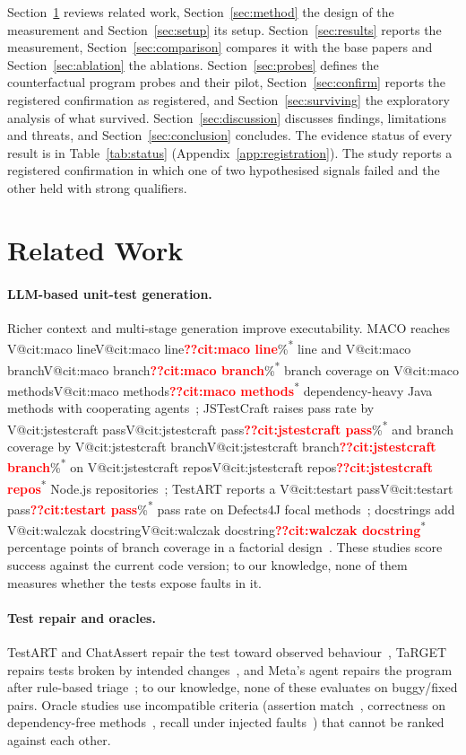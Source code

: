 \documentclass[pdflatex,iicol,sn-mathphys-num]{sn-jnl}
\makeatletter
\newcommand{\V}[1]{\ifcsname V@#1\endcsname\csname V@#1\endcsname\else\textbf{\textcolor{red}{??#1}}\fi}
\newcommand{\cited}{\textsuperscript{*}}
\makeatother
\begin{document}
Section~\ref{sec:related} reviews related work, Section~\ref{sec:method} the design of the measurement and Section~\ref{sec:setup} its setup. Section~\ref{sec:results} reports the measurement, Section~\ref{sec:comparison} compares it with the base papers and Section~\ref{sec:ablation} the ablations. Section~\ref{sec:probes} defines the counterfactual program probes and their pilot, Section~\ref{sec:confirm} reports the registered confirmation as registered, and Section~\ref{sec:surviving} the exploratory analysis of what survived. Section~\ref{sec:discussion} discusses findings, limitations and threats, and Section~\ref{sec:conclusion} concludes. The evidence status of every result is in Table~\ref{tab:status} (Appendix~\ref{app:registration}). The study reports a registered confirmation in which one of two hypothesised signals failed and the other held with strong qualifiers.

\section{Related Work}\label{sec:related}

\paragraph{LLM-based unit-test generation.} Richer context and multi-stage generation improve executability. MACO reaches \V{cit:maco line}\%\cited{} line and \V{cit:maco branch}\%\cited{} branch coverage on \V{cit:maco methods}\cited{} dependency-heavy Java methods with cooperating agents~\cite{xie2026maco}; JSTestCraft raises pass rate by \V{cit:jstestcraft pass}\%\cited{} and branch coverage by \V{cit:jstestcraft branch}\%\cited{} on \V{cit:jstestcraft repos}\cited{} Node.js repositories~\cite{liu2026jstestcraft}; TestART reports a \V{cit:testart pass}\%\cited{} pass rate on Defects4J focal methods~\cite{gu2026testart}; docstrings add \V{cit:walczak docstring}\cited{} percentage points of branch coverage in a factorial design~\cite{walczak2026context}. These studies score success against the current code version; to our knowledge, none of them measures whether the tests expose faults in it.

\paragraph{Test repair and oracles.} TestART and ChatAssert repair the test toward observed behaviour~\cite{gu2026testart,hayet2025chatassert}, TaRGET repairs tests broken by intended changes~\cite{yaraghi2025target}, and Meta's agent repairs the program after rule-based triage~\cite{maddila2026agentic}; to our knowledge, none of these evaluates on buggy/fixed pairs. Oracle studies use incompatible criteria (assertion match~\cite{hayet2025chatassert}, correctness on dependency-free methods~\cite{xu2026candor}, recall under injected faults~\cite{li2026mitgen}) that cannot be ranked against each other.
\end{document}
